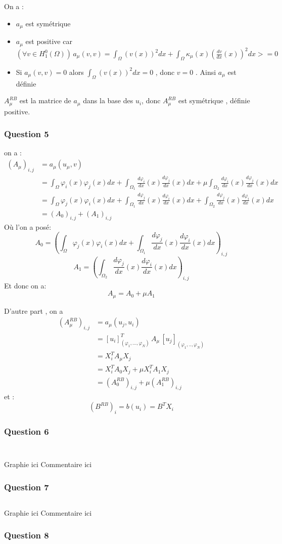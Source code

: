 \documentclass{article}
\newcommand{\DDeriv}[1]{\ensuremath{\frac{d#1}{dx}}}
\newcommand{\Q}[1]{\subsubsection*{Question #1}}
\begin{document}
On a : 
\begin{itemize}
	\item $a_{\mu}$ est symétrique 
	\item $a_\mu$ est positive car $(\forall v \in H^0_1(\Omega)) \, a_{\mu}(v,v) = \int_{\Omega}  (v(x))^{2}dx  +   \int_{\Omega}  \kappa_{\mu}(x) (\DDeriv{v}(x))^{2}  dx >= 0$ 
	\item Si $  a_{\mu}(v,v) = 0 $ alors $ \int_{\Omega}  (v(x))^{2}dx = 0 $ , donc $v=0$ . Ainsi $ a_{\mu} $ est définie 
\end{itemize}
$ A_{\mu}^{RB} $ est la matrice de $a_\mu$ dans la base des $u_i$, donc $ A_{\mu}^{RB} $ est symétrique , définie positive.


\Q{5}
on a : 
\begin{align*}
(A_{\mu})_{i,j} &= a_{\mu}(u_{\mu},v) \\
&= \int_{\Omega}  \varphi_i(x) \varphi_j(x)dx  +   \int_{\Omega_{1}} \DDeriv{\varphi_i}(x) \DDeriv{\varphi_j}(x) dx  +  \mu \int_{\Omega_{2}} \DDeriv{\varphi_i}(x) \DDeriv{\varphi_j}(x) dx \\
&= \int_{\Omega} \varphi_{j}(x) \varphi_{i}(x)dx  +   \int_{\Omega_{1}} \DDeriv{\varphi_{j}}(x) \DDeriv{\varphi_{i}}(x) dx 
+ \int_{\Omega_{2}} \DDeriv{\varphi_{j}}(x) \DDeriv{\varphi_{i}}(x) dx \\
&= (A_{0})_{i,j} + (A_{1})_{i,j}
\end{align*}
Où l'on a posé:
$$ A_{0} = \left(\int_{\Omega} \varphi_{j}(x) \varphi_{i}(x)dx  +   \int_{\Omega_{1}} \DDeriv{\varphi_{j}}(x) \DDeriv{\varphi_{i}}(x) dx\right)_{i, j} $$
$$ A_{1} = \left(\int_{\Omega_{2}} \DDeriv{\varphi_{j}}(x) \DDeriv{\varphi_{i}}(x) dx\right)_{i, j} $$
Et donc on a: $$ A_{\mu} = A_{0} + \mu A_{1} $$


D'autre part , on a 
\begin{align*}
(A_{\mu}^{RB})_{i,j} &= a_{\mu}(u_{j},u_{i}) \\
&= [u_{i}]_{(\varphi_{1},...,\varphi_{N})}^T \, A_\mu \, [u_{j}]_{(\varphi_{1},..,\varphi_{N})} \\
&= X_i^T A_\mu X_j \\
&= X_i^T A_0 X_j + \mu X_i^T A_1 X_j \\
&= (A_0^{RB})_{i,j} + \mu (A_1^{RB})_{i,j}
\end{align*}
et :
$$ (B^{RB})_{i} = b(u_{i}) = B^T X_i $$


\Q{6}
\inputminted{scilab}{codes/calcul2.sce}
\inputminted{scilab}{codes/question6.sce}

Graphie ici
Commentaire ici

\Q{7}
\inputminted{scilab}{codes/question7.sce}
Graphie ici
Commentaire ici

\Q{8}
\inputminted{scilab}{codes/equation.edp}
\end{document}
